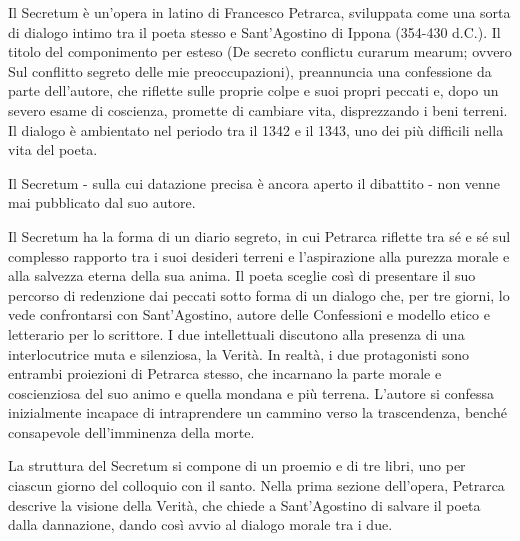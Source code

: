 \documentclass[10pt,a4paper]{article}
\begin{document}
Il Secretum è un’opera in latino di Francesco Petrarca, sviluppata come una sorta di dialogo intimo tra il poeta stesso e Sant'Agostino di Ippona (354-430 d.C.). Il titolo del componimento per esteso (De secreto conflictu curarum mearum; ovvero Sul conflitto segreto delle mie preoccupazioni), preannuncia una confessione da parte dell’autore, che riflette sulle proprie colpe e suoi propri peccati e, dopo un severo esame di coscienza, promette di cambiare vita, disprezzando i beni terreni. Il dialogo è ambientato nel periodo tra il 1342 e il 1343, uno dei più difficili nella vita del poeta.

Il Secretum - sulla cui datazione precisa è ancora aperto il dibattito - non venne mai pubblicato dal suo autore.

Il Secretum ha la forma di un diario segreto, in cui Petrarca riflette tra sé e sé sul complesso rapporto tra i suoi desideri terreni e l’aspirazione alla purezza morale e alla salvezza eterna della sua anima. Il poeta sceglie così di presentare il suo percorso di redenzione dai peccati sotto forma di un dialogo che, per tre giorni, lo vede confrontarsi con Sant’Agostino, autore delle Confessioni e modello etico e letterario per lo scrittore. I due intellettuali discutono alla presenza di una interlocutrice muta e silenziosa, la Verità. In realtà, i due protagonisti sono entrambi proiezioni di Petrarca stesso, che incarnano la parte morale e coscienziosa del suo animo e quella mondana e più terrena. L’autore si confessa inizialmente incapace di intraprendere un cammino verso la trascendenza, benché consapevole dell’imminenza della morte.

La struttura del Secretum si compone di un proemio e di tre libri, uno per ciascun giorno del colloquio con il santo. Nella prima sezione dell’opera, Petrarca descrive la visione della Verità, che chiede a Sant’Agostino di salvare il poeta dalla dannazione, dando così avvio al dialogo morale tra i due.
\end{document}
